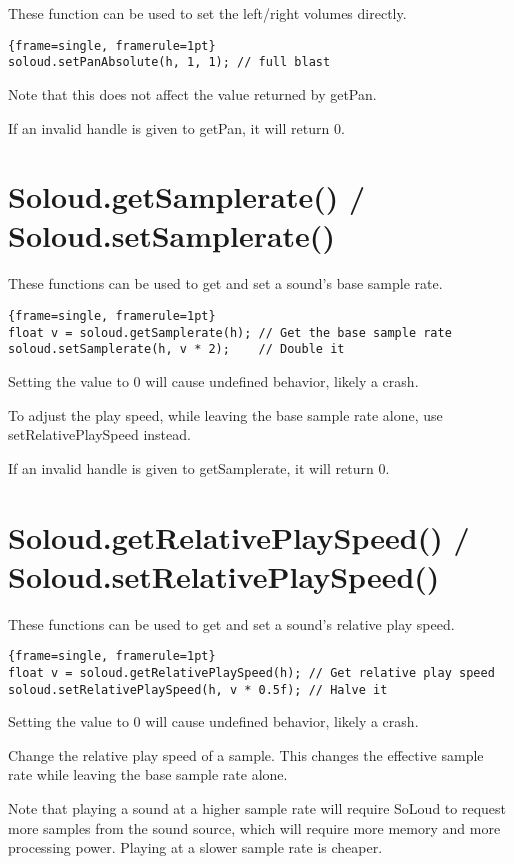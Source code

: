 These function can be used to set the left/right volumes directly.

\begin{lstlisting}{frame=single, framerule=1pt}
soloud.setPanAbsolute(h, 1, 1); // full blast
\end{lstlisting}

Note that this does not affect the value returned by getPan.

If an invalid handle is given to getPan, it will return 0.

\section{Soloud.getSamplerate() / Soloud.setSamplerate()}

These functions can be used to get and set a sound's base sample rate.

\begin{lstlisting}{frame=single, framerule=1pt}
float v = soloud.getSamplerate(h); // Get the base sample rate
soloud.setSamplerate(h, v * 2);    // Double it
\end{lstlisting}

Setting the value to 0 will cause undefined behavior, likely a crash.

To adjust the play speed, while leaving the base sample rate alone, 
use setRelativePlaySpeed instead.

If an invalid handle is given to getSamplerate, it will return 0.

\section{Soloud.getRelativePlaySpeed() / Soloud.setRelativePlaySpeed()}

These functions can be used to get and set a sound's relative play speed.

\begin{lstlisting}{frame=single, framerule=1pt}
float v = soloud.getRelativePlaySpeed(h); // Get relative play speed
soloud.setRelativePlaySpeed(h, v * 0.5f); // Halve it
\end{lstlisting}

Setting the value to 0 will cause undefined behavior, likely a crash.

Change the relative play speed of a sample. This changes the effective sample rate while leaving the base sample rate alone.

Note that playing a sound at a higher sample rate will require SoLoud to request more samples from the sound source, which will require more memory and more processing power. Playing at a slower sample rate is cheaper.

